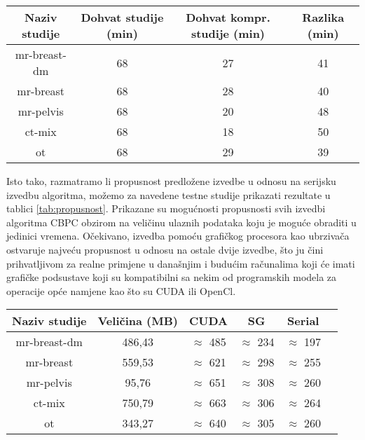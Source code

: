 \documentclass[times, utf8, zavrsni, numeric, sort]{fer}
\begin{document}
\begin{center}
 \label{tab:time_kompr}
\begin{tabular}{| c | c | c | c |}
\hline
Naziv studije & Dohvat studije (min) & Dohvat kompr. studije (min) & Razlika (min)
\\
\hline
mr-breast-dm & 68 & 27 & 41
\\
\hline
mr-breast & 68 & 28 & 40
\\
\hline
mr-pelvis & 68 & 20 & 48
\\
\hline
ct-mix & 68 & 18 & 50
\\
\hline
ot & 68 & 29 & 39
\\
\hline
\end{tabular}
\end{center}

Isto tako, razmatramo li propusnost predložene izvedbe u odnosu na serijsku izvedbu algoritma, možemo za navedene testne studije prikazati rezultate u tablici \ref{tab:propusnost}. Prikazane su mogućnosti propusnosti svih izvedbi algoritma CBPC obzirom na veličinu ulaznih podataka koju je moguće obraditi u jedinici vremena. Očekivano, izvedba pomoću grafičkog procesora kao ubrzivača ostvaruje najveću propusnost u odnosu na ostale dvije izvedbe, što ju čini prihvatljivom za realne primjene u današnjim i budućim računalima koji će imati grafičke podsustave koji su kompatibilni sa nekim od programskih modela za operacije opće namjene kao što su CUDA ili OpenCl.

\begin{center}
 \label{tab:propusnost}
\begin{tabular}{| c | c | c | c | c | c |}
\hline
Naziv studije & Veličina (MB) & CUDA & SG & Serial 
\\
\hline
mr-breast-dm & 486,43 & $\approx$ 485 & $\approx$ 234 & $\approx$ 197
\\
\hline
mr-breast & 559,53 & $\approx$ 621 & $\approx$ 298 & $\approx$ 255
\\
\hline
mr-pelvis & 95,76 & $\approx$ 651 & $\approx$ 308 & $\approx$ 260
\\
\hline
ct-mix & 750,79 & $\approx$ 663 & $\approx$ 306 & $\approx$ 264
\\
\hline
ot & 343,27 & $\approx$ 640 & $\approx$ 305 & $\approx$ 260
\\
\hline
\end{tabular}
\end{center}
\end{document}
